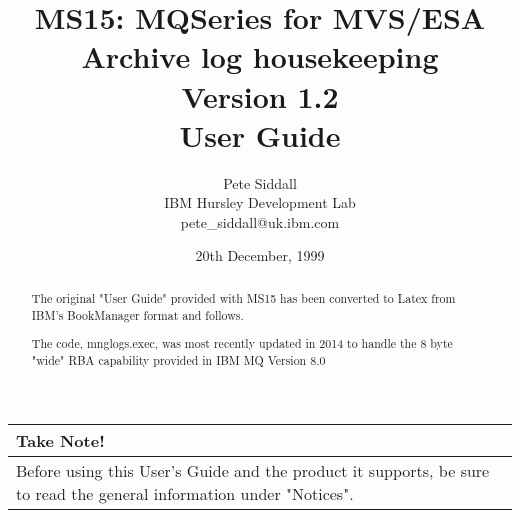 \documentclass[a4paper,12pt]{report}
\begin{document}
%
%
\newcommand{\wmq}{IBM MQ }
\newcommand{\wmqz}{\wmq for z/OS }

\renewcommand{\chaptername}{}
\renewcommand{\thechapter}{}

\setcounter{secnumdepth}{0}


%

\renewcommand{\abstractname}{Release Note}
\begin{abstract}
The original "User Guide" provided with MS15 has been converted to 
Latex from IBM's BookManager format and follows.

The code, mnglogs.exec, was most recently updated in 2014 to handle 
the 8 byte 
"wide" RBA capability provided in \wmq Version 8.0
\end{abstract}

\date{20th December, 1999}
\title{
MS15: MQSeries for MVS/ESA\\ Archive log housekeeping\\
Version 1.2\\
User Guide
}
\author{Pete Siddall\\
IBM Hursley Development Lab\\
pete\_siddall@uk.ibm.com
}
\maketitle

\clearpage
\begin{flushleft}
\begin{tabular}{|p{\textwidth}|}
\hline
Take Note!\\
\hline
Before using this User's Guide and the product it supports, be sure
to read the general information under
"Notices".\\
\hline
\end{tabular}
\end{flushleft}
\end{document}
